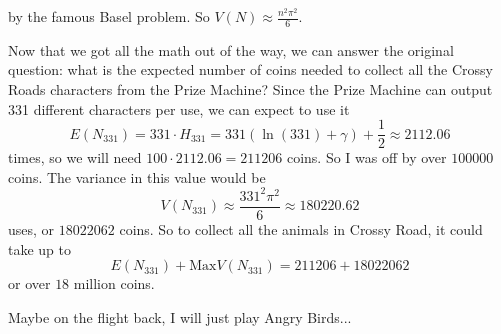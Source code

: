 by the famous Basel problem. So $V(N)\approx \frac{n^2\pi^2}{6}$. 

Now that we got all the math out of the way, we can answer the original question: what is the expected number of coins needed to collect all the Crossy Roads characters from the Prize Machine? Since the Prize Machine can output 331 different characters per use, we can expect to use it $$E(N_{331})=331\cdot H_{331}=331(\ln (331)+\gamma)+\frac{1}{2}\approx 2112.06$$ times, so we will need $100\cdot 2112.06=211206$ coins. So I was off by over $100000$ coins. The variance in this value would be $$V(N_{331})\approx \frac{331^2\pi^2}{6}\approx 180220.62$$ uses, or $18022062$ coins. So to collect all the animals in Crossy Road, it could take up to $$E(N_{331})+\text{Max}V(N_{331})=211206+18022062$$ or over $18$ million coins. 

Maybe on the flight back, I will just play Angry Birds...





